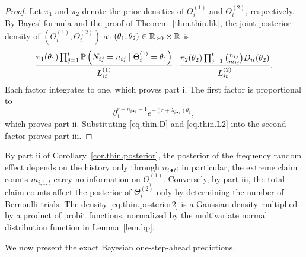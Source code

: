 \begin{proof}
Let \(\pi_1\) and \(\pi_2\) denote the prior densities of
\(\Theta_i^{(1)}\) and \(\Theta_i^{(2)}\), respectively. By Bayes'
formula and the proof of Theorem~\ref{thm.thin.lik}, the joint
posterior density of
\(\left(\Theta_i^{(1)},\Theta_i^{(2)}\right)\) at
\((\theta_1,\theta_2)\in\Real_{>0}\times\Real\) is
\[
\frac{
\pi_1(\theta_1)
\prod_{j=1}^t\P{N_{ij}=n_{ij}\mid\Theta_i^{(1)}=\theta_1}
}{L^{(1)}_{it}}
\cdot
\frac{
\pi_2(\theta_2)
\prod_{j=1}^t\binom{n_{ij}}{m_{ij}}D_{it}(\theta_2)
}{L^{(2)}_{it}}.
\]
Each factor integrates to one, which proves part i. The first factor
is proportional to
\[
\theta_1^{r+n_{i\bullet t}-1}e^{-(r+\lambda_{i\bullet t})\theta_1},
\]
which proves part ii. Substituting \eqref{eq.thin.D} and
\eqref{eq.thin.L2} into the second factor proves part iii.
\end{proof}

By part ii of Corollary~\ref{cor.thin.posterior}, the posterior of the
frequency random effect depends on the history only through
\(n_{i\bullet t}\); in particular, the extreme claim counts
\(m_{i,1:t}\) carry no information on \(\Theta_i^{(1)}\). Conversely,
by part iii, the total claim counts affect the posterior of
\(\Theta_i^{(2)}\) only by determining the number of Bernoulli trials.
The density \eqref{eq.thin.posterior2} is a Gaussian density
multiplied by a product of probit functions, normalized by the
multivariate normal distribution function in Lemma~\ref{lem.bp}.

We now present the exact Bayesian one-step-ahead predictions.

